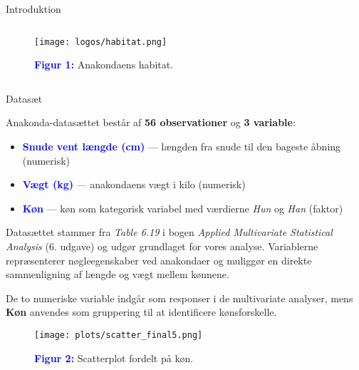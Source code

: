 \documentclass[final]{beamer}
\newlength{\colwidth}
\begin{document}
\begin{frame}[t]
\begin{columns}[t]
\begin{column}{\colwidth}
\begin{block}{Introduktion}
\begin{columns}
  \begin{column}{0.55\textwidth}
    \begin{figure}
      \centering
      \texttt{[image: logos/habitat.png]}
      \vspace{1.0em}
      
      \textbf{\textcolor{blue}{Figur 1:}} Anakondaens habitat.
    \end{figure}
  \end{column}



  
\end{columns}
	
  \end{block}

\vspace{-1em}
\begin{block}{Datasæt}
\justifying

Anakonda-datasættet består af \textbf{56 observationer} og \textbf{3 variable}:

\begin{itemize}
  \item \textbf{\textcolor{blue}{Snude vent længde (cm)}} — længden fra snude til den bageste åbning  (numerisk)
  \item \textbf{\textcolor{blue}{Vægt (kg)}} — anakondaens vægt i kilo (numerisk)
  \item \textbf{\textcolor{blue}{Køn}} — køn som kategorisk variabel med værdierne \textit{Hun} og \textit{Han} (faktor)
\end{itemize}

Datasættet stammer fra \textit{Table 6.19} i bogen \textit{Applied Multivariate Statistical Analysis} (6. udgave) og udgør grundlaget for vores analyse. Variablerne repræsenterer nøgleegenskaber ved anakondaer og muliggør en direkte sammenligning af længde og vægt mellem kønnene.

\vspace{1em}

De to numeriske variable indgår som responser i de multivariate analyser, mens \textbf{Køn} anvendes som gruppering til at identificere kønsforskelle.

	\begin{figure}[h!]
	\centering
	\texttt{[image: plots/scatter\_final5.png]}
	
	\textbf{\textcolor{blue}{Figur 2:}} Scatterplot fordelt på køn.
	
	
	\end{figure}


\end{block}
\end{column}
\end{columns}
\end{frame}
\end{document}
